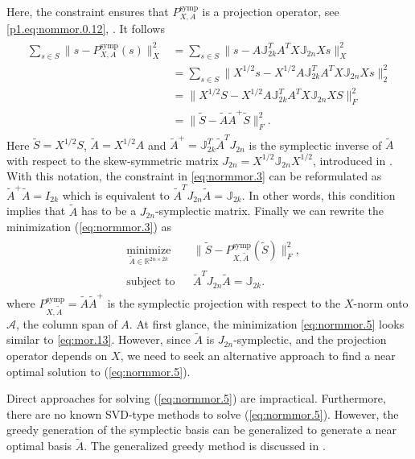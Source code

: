 Here, the constraint ensures that $P_{X,A}^{\text{symp}}$ is a projection operator, see \eqref{p1.eq:nommor.0.12}, . It follows
\begin{eqnarray} \label{eq:normmor.4}
\begin{aligned}
	\sum_{s\in S} \| s - P_{X,A}^{\text{symp}}(s) \|_X^2 &= \sum_{s\in S} \| s - A \mathbb J_{2k}^T A^T X \mathbb J_{2n} Xs \|_X^2 \\
	&= \sum_{s\in S} \| X^{1/2}s - X^{1/2} A \mathbb J_{2k}^T A^T X \mathbb J_{2n} X s \|_2^2 \\
	&= \| X^{1/2} S - X^{1/2} A \mathbb J_{2k}^T A^T X \mathbb J_{2n} X S \|_F^2 \\
	&= \| \tilde S - \tilde A \tilde A ^+ \tilde S \|_F^2.
\end{aligned}
\end{eqnarray}
Here $\tilde S = X^{1/2} S$, $\tilde A = X^{1/2} A$ and $\tilde A^+ = \mathbb J_{2k}^T \tilde A^T J_{2n}$ is the symplectic inverse of $\tilde A$ with respect to the skew-symmetric matrix $J_{2n} = X^{1/2} \mathbb J_{2n} X^{1/2}$, introduced in . With this notation, the constraint in \eqref{eq:normmor.3} can be reformulated as $\tilde A ^+ \tilde A = I_{2k}$ which is equivalent to $\tilde A ^T J_{2n} \tilde A = \mathbb J_{2k}$. In other words, this condition implies that $\tilde A$ has to be a $J_{2n}$-symplectic matrix. Finally we can rewrite the minimization (\ref{eq:normmor.3}) as
\begin{eqnarray} \label{eq:normmor.5}
\begin{aligned}
& \underset{\tilde A\in \mathbb{R}^{2n\times 2k}}{\text{minimize}}
& & \| \tilde S - P^\text{symp}_{X,\tilde A}(\tilde S) \|_F^2, \\
& \text{subject to}
& & \tilde A^T J_{2n} \tilde A = \mathbb J_{2k}.
\end{aligned}
\end{eqnarray}
where $P^\text{symp}_{X,\tilde A} = \tilde A \tilde A^+$ is the symplectic projection with respect to the $X$-norm onto $\mathcal A$, the column span of $A$. At first glance, the minimization \eqref{eq:normmor.5} looks similar to \eqref{eq:mor.13}. However, since $\tilde A$ is $J_{2n}$-symplectic, and the projection operator depends on $X$, we need to seek an alternative approach to find a near optimal solution to (\ref{eq:normmor.5}). 

Direct approaches for solving (\ref{eq:normmor.5}) are impractical. Furthermore, there are no known SVD-type methods to solve (\ref{eq:normmor.5}). However, the greedy generation of the symplectic basis can be generalized to generate a near optimal basis $\tilde A$. The generalized greedy method is discussed in .

